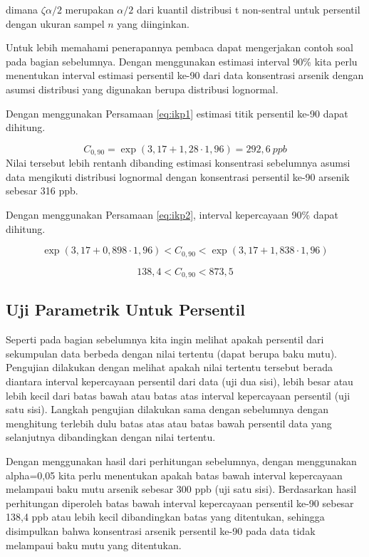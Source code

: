 \documentclass[]{book}
\begin{document}
dimana \(\zeta{\alpha/2}\) merupakan \(\alpha/2\) dari kuantil
distribusi t non-sentral untuk persentil dengan ukuran sampel \(n\) yang
diinginkan.

Untuk lebih memahami penerapannya pembaca dapat mengerjakan contoh soal
pada bagian sebelumnya. Dengan menggunakan estimasi interval 90\% kita
perlu menentukan interval estimasi persentil ke-90 dari data konsentrasi
arsenik dengan asumsi distribusi yang digunakan berupa distribusi
lognormal.

Dengan menggunakan Persamaan \eqref{eq:ikp1} estimasi titik persentil
ke-90 dapat dihitung.

\[
C_{0,90}=\exp\left(3,17+1,28\cdot1,96\right)=292,6\ ppb
\] Nilai tersebut lebih rentanh dibanding estimasi konsentrasi
sebelumnya asumsi data mengikuti distribusi lognormal dengan konsentrasi
persentil ke-90 arsenik sebesar 316 ppb.

Dengan menggunakan Persamaan \eqref{eq:ikp2}, interval kepercayaan 90\%
dapat dihitung.

\[
\exp\left(3,17+0,898\cdot1,96\right)<C_{0,90}<\exp\left(3,17+1,838\cdot1,96\right)
\]

\[
138,4<C_{0,90}<873,5
\]

\subsection{Uji Parametrik Untuk
Persentil}\label{uji-parametrik-untuk-persentil}

Seperti pada bagian sebelumnya kita ingin melihat apakah persentil dari
sekumpulan data berbeda dengan nilai tertentu (dapat berupa baku mutu).
Pengujian dilakukan dengan melihat apakah nilai tertentu tersebut berada
diantara interval kepercayaan persentil dari data (uji dua sisi), lebih
besar atau lebih kecil dari batas bawah atau batas atas interval
kepercayaan persentil (uji satu sisi). Langkah pengujian dilakukan sama
dengan sebelumnya dengan menghitung terlebih dulu batas atas atau batas
bawah persentil data yang selanjutnya dibandingkan dengan nilai
tertentu.

Dengan menggunakan hasil dari perhitungan sebelumnya, dengan menggunakan
alpha=0,05 kita perlu menentukan apakah batas bawah interval kepercayaan
melampaui baku mutu arsenik sebesar 300 ppb (uji satu sisi). Berdasarkan
hasil perhitungan diperoleh batas bawah interval kepercayaan persentil
ke-90 sebesar 138,4 ppb atau lebih kecil dibandingkan batas yang
ditentukan, sehingga disimpulkan bahwa konsentrasi arsenik persentil
ke-90 pada data tidak melampaui baku mutu yang ditentukan.
\end{document}
